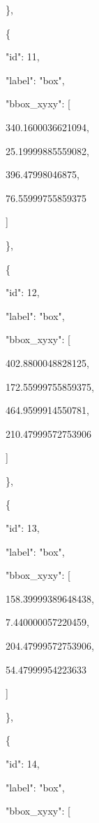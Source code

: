 \documentclass[10pt,a4paper]{article}
\begin{document}
    \},\allowbreak{}\par
    \{\par
      "id":\allowbreak{} 11,\allowbreak{}\par
      "label":\allowbreak{} "box",\allowbreak{}\par
      "bbox\_xyxy":\allowbreak{} [\par
        340.1600036621094,\allowbreak{}\par
        25.19999885559082,\allowbreak{}\par
        396.47998046875,\allowbreak{}\par
        76.55999755859375\par
      ]\par
    \},\allowbreak{}\par
    \{\par
      "id":\allowbreak{} 12,\allowbreak{}\par
      "label":\allowbreak{} "box",\allowbreak{}\par
      "bbox\_xyxy":\allowbreak{} [\par
        402.8800048828125,\allowbreak{}\par
        172.55999755859375,\allowbreak{}\par
        464.9599914550781,\allowbreak{}\par
        210.47999572753906\par
      ]\par
    \},\allowbreak{}\par
    \{\par
      "id":\allowbreak{} 13,\allowbreak{}\par
      "label":\allowbreak{} "box",\allowbreak{}\par
      "bbox\_xyxy":\allowbreak{} [\par
        158.39999389648438,\allowbreak{}\par
        7.440000057220459,\allowbreak{}\par
        204.47999572753906,\allowbreak{}\par
        54.47999954223633\par
      ]\par
    \},\allowbreak{}\par
    \{\par
      "id":\allowbreak{} 14,\allowbreak{}\par
      "label":\allowbreak{} "box",\allowbreak{}\par
      "bbox\_xyxy":\allowbreak{} [\par
\end{document}
